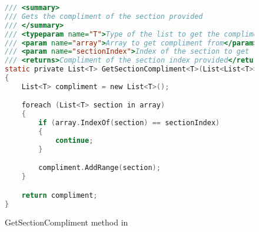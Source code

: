 
\label{GetSectionCompliment Method}

\begin{figure}
\begin{lstlisting}[language=C]
/// <summary>
/// Gets the compliment of the section provided
/// </summary>
/// <typeparam name="T">Type of the list to get the compliment of</typeparam>
/// <param name="array">Array to get compliment from</param>
/// <param name="sectionIndex">Index of the section to get the compliment of</param>
/// <returns>Compliment of the section index provided</returns>
static private List<T> GetSectionCompliment<T>(List<List<T>> array, int sectionIndex)
{
	List<T> compliment = new List<T>();

	foreach (List<T> section in array)
	{
		if (array.IndexOf(section) == sectionIndex)
		{
			continue;
		}

		compliment.AddRange(section);
	}

	return compliment;
}
\end{lstlisting}
\caption{GetSectionCompliment method in \mytool}
\label{fig:GetSectionCompliment1}
\end{figure}
